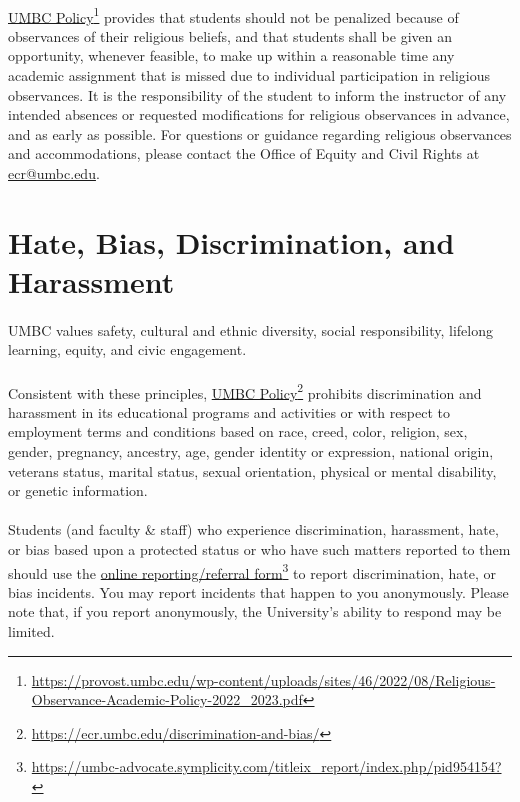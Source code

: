 \documentclass[letter,10pt]{article}
\begin{document}
\paragraph{}\href{https://provost.umbc.edu/wp-content/uploads/sites/46/2022/08/Religious-Observance-Academic-Policy-2022_2023.pdf}{UMBC Policy}\footnote{\url{https://provost.umbc.edu/wp-content/uploads/sites/46/2022/08/Religious-Observance-Academic-Policy-2022_2023.pdf}} provides that students should not be penalized because of observances of their religious beliefs, and that students shall be given an opportunity, whenever feasible, to make up within a reasonable time any academic assignment that is missed due to individual participation in religious observances. It is the responsibility of the student to inform the instructor of any intended absences or requested modifications for religious observances in advance, and as early as possible. For questions or guidance regarding religious observances and accommodations, please contact the Office of Equity and Civil Rights at \href{mailto:ecr@umbc.edu}{ecr@umbc.edu}.

\section*{Hate, Bias, Discrimination, and Harassment}
\paragraph{}UMBC values safety, cultural and ethnic diversity, social responsibility, lifelong learning, equity, and civic engagement.

\paragraph{}Consistent with these principles, \href{https://ecr.umbc.edu/discrimination-and-bias/}{UMBC Policy}\footnote{\url{https://ecr.umbc.edu/discrimination-and-bias/}} prohibits discrimination and harassment in its educational programs and activities or with respect to employment terms and conditions based on race, creed, color, religion, sex, gender, pregnancy, ancestry, age, gender identity or expression, national origin, veterans status, marital status, sexual orientation, physical or mental disability, or genetic information.

\paragraph{}Students (and faculty \& staff) who experience discrimination, harassment, hate, or bias based upon a protected status or who have such matters reported to them should use the \href{https://umbc-advocate.symplicity.com/titleix_report/index.php/pid954154?}{online reporting/referral form}\footnote{\url{https://umbc-advocate.symplicity.com/titleix_report/index.php/pid954154?}} to report discrimination, hate, or bias incidents. You may report incidents that happen to you anonymously. Please note that, if you report anonymously, the University’s ability to respond may be limited.
\end{document}

